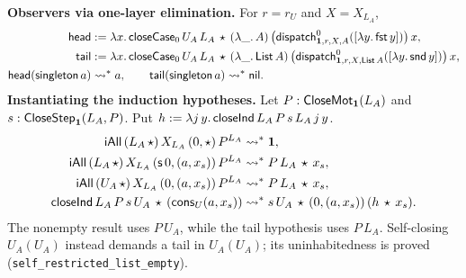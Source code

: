 \textbf{Observers via one-layer elimination.}
For $r=r_U$ and $X=X_{L_A}$,
\[
\begin{aligned}
 \mathsf{head}
  &:=\lambda x.\,\mathsf{closeCase}_0\,U_A\,L_A\,\star\,(\lambda\_.\,A)\,
    \bigl(\mathsf{dispatch}^{0}_{\mathbf{1},r,X,A}([\lambda y.\,\mathsf{fst}\,y])\bigr)\,x,\\
 \mathsf{tail}
  &:=\lambda x.\,\mathsf{closeCase}_0\,U_A\,L_A\,\star\,
    (\lambda\_.\,\mathsf{List}\,A)\,
    \bigl(\mathsf{dispatch}^{0}_{\mathbf{1},r,X,\mathsf{List}\,A}
                  ([\lambda y.\,\mathsf{snd}\,y])\bigr)\,x,\\
 \mathsf{head}(\mathsf{singleton}\,a)&\leadsto^*a,\qquad
 \mathsf{tail}(\mathsf{singleton}\,a)\leadsto^*\mathsf{nil}.
\end{aligned}
\]
\textbf{Instantiating the induction hypotheses.}
Let $P:\mathsf{CloseMot}_{\mathbf{1}}(L_A)$ and
$s:\mathsf{CloseStep}_{\mathbf{1}}(L_A,P)$. Put
$h:=\lambda j\,y.\,\mathsf{closeInd}\,L_A\,P\,s\,L_A\,j\,y$.
\[
\begin{aligned}
 \mathsf{iAll}\,(L_A\,\star)\,X_{L_A}\,(0,\star)\,P^{L_A}
    &\leadsto^*\mathbf{1},\\
 \mathsf{iAll}\,(L_A\,\star)\,X_{L_A}\,(\mathsf{s}\,0,(a,x_s))\,P^{L_A}
    &\leadsto^*P\,L_A\,\star\,x_s,\\
 \mathsf{iAll}\,(U_A\,\star)\,X_{L_A}\,(0,(a,x_s))\,P^{L_A}
    &\leadsto^*P\,L_A\,\star\,x_s,\\
 \mathsf{closeInd}\,L_A\,P\,s\,U_A\,\star\,(\mathsf{cons}_U(a,x_s))
    &\leadsto^*s\,U_A\,\star\,(0,(a,x_s))\,(h\,\star\,x_s).
\end{aligned}
\]
The nonempty result uses $P\,U_A$, while the tail hypothesis uses $P\,L_A$.
Self-closing $U_A(U_A)$ instead demands a tail in $U_A(U_A)$; its
uninhabitedness is proved (\texttt{self\_restricted\_list\_empty}).
